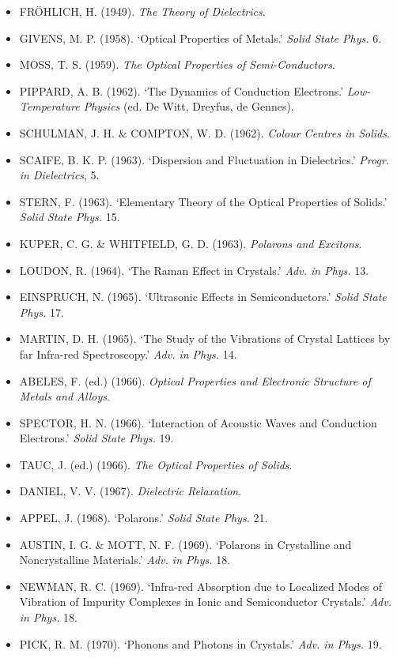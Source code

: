 \begin{itemize}[leftmargin=2em, itemsep=0.2em]
\item FRÖHLICH, H. (1949). \emph{The Theory of Dielectrics}.
\item GIVENS, M. P. (1958). `Optical Properties of Metals.' \emph{Solid State Phys.} 6.
\item MOSS, T. S. (1959). \emph{The Optical Properties of Semi-Conductors}.
\item PIPPARD, A. B. (1962). `The Dynamics of Conduction Electrons.' \emph{Low-Temperature Physics} (ed. De Witt, Dreyfus, de Gennes).
\item SCHULMAN, J. H. \& COMPTON, W. D. (1962). \emph{Colour Centres in Solids}.
\item SCAIFE, B. K. P. (1963). `Dispersion and Fluctuation in Dielectrics.' \emph{Progr. in Dielectrics}, 5.
\item STERN, F. (1963). `Elementary Theory of the Optical Properties of Solids.' \emph{Solid State Phys.} 15.
\item KUPER, C. G. \& WHITFIELD, G. D. (1963). \emph{Polarons and Excitons}.
\item LOUDON, R. (1964). `The Raman Effect in Crystals.' \emph{Adv. in Phys.} 13.
\item EINSPRUCH, N. (1965). `Ultrasonic Effects in Semiconductors.' \emph{Solid State Phys.} 17.
\item MARTIN, D. H. (1965). `The Study of the Vibrations of Crystal Lattices by far Infra-red Spectroscopy.' \emph{Adv. in Phys.} 14.
\item ABELES, F. (ed.) (1966). \emph{Optical Properties and Electronic Structure of Metals and Alloys}.
\item SPECTOR, H. N. (1966). `Interaction of Acoustic Waves and Conduction Electrons.' \emph{Solid State Phys.} 19.
\item TAUC, J. (ed.) (1966). \emph{The Optical Properties of Solids}.
\item DANIEL, V. V. (1967). \emph{Dielectric Relaxation}.
\item APPEL, J. (1968). `Polarons.' \emph{Solid State Phys.} 21.
\item AUSTIN, I. G. \& MOTT, N. F. (1969). `Polarons in Crystalline and Noncrystalline Materials.' \emph{Adv. in Phys.} 18.
\item NEWMAN, R. C. (1969). `Infra-red Absorption due to Localized Modes of Vibration of Impurity Complexes in Ionic and Semiconductor Crystals.' \emph{Adv. in Phys.} 18.
\item PICK, R. M. (1970). `Phonons and Photons in Crystals.' \emph{Adv. in Phys.} 19.
\end{itemize}

